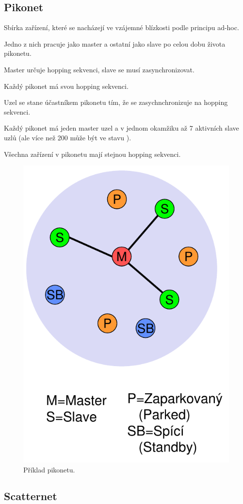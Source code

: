 \subsection{Pikonet}

\begin{compactitem}
    \item Sbírka zařízení, které se nacházejí ve vzájemné blízkosti podle
    principu ad-hoc.

    \item Jedno z nich pracuje jako master a ostatní jako slave po celou dobu života pikonetu.

    \item Master určuje hopping sekvenci, slave se musí zasynchronizovat.

    \item Každý pikonet má svou hopping sekvenci.

    \item Uzel se stane účastníkem pikonetu tím, že se zasychnchronizuje na hopping sekvenci.

    \item Každý pikonet má jeden master uzel a v jednom okamžiku až 7 aktivních slave uzlů (ale více než 200 může být ve stavu ).

    \item Všechna zařízení v pikonetu mají stejnou hopping sekvenci.
\end{compactitem}

\begin{figure}[H]
    \centering
    \includegraphics[width=0.4\linewidth]{pikonet.pdf}
    \caption{Příklad pikonetu.}
\end{figure}

\subsection{Scatternet}

